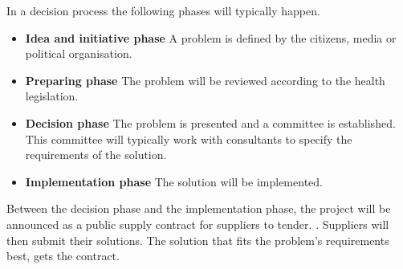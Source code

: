 In a decision process the following phases will typically happen. \cite{Sjaelland}


\begin{itemize}
  \setlength{\itemsep}{1pt}
  \setlength{\parskip}{0pt}
  \setlength{\parsep}{0pt}
	\item \textbf{Idea and initiative phase} A problem is defined by the citizens, media or political organisation.
	\item \textbf{Preparing phase} The problem will be reviewed according to the health legislation.
	\item \textbf{Decision phase} The problem is presented and a committee is established. This committee will typically work with consultants to specify the requirements of the solution.
	\item \textbf{Implementation phase} The solution will be implemented. 
\end{itemize}


Between the decision phase and the implementation phase, the project will be announced as a public supply contract for suppliers to tender. \cite{Union2004}. Suppliers will then submit their solutions. The solution that fits the problem's requirements best, gets the contract. 

